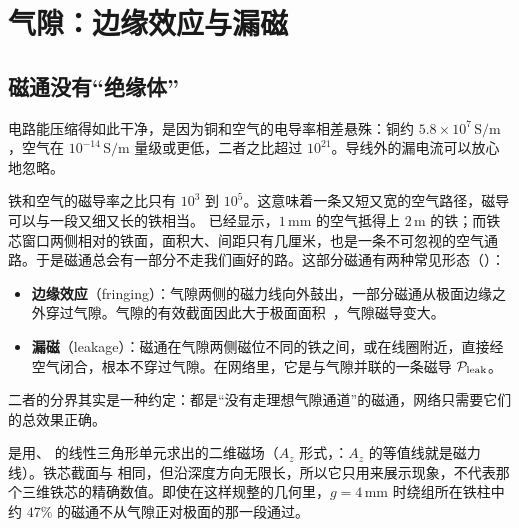 
\section{气隙：边缘效应与漏磁}\label{sec:lumped-fringing}

\subsection{磁通没有“绝缘体”}
电路能压缩得如此干净，是因为铜和空气的电导率相差悬殊：铜约 $5.8\times10^7\,\mathrm{S/m}$，空气在 $10^{-14}\,\mathrm{S/m}$ 量级或更低，二者之比超过 $10^{21}$。导线外的漏电流可以放心地忽略。

铁和空气的磁导率之比只有 $10^3$ 到 $10^5$。这意味着一条又短又宽的空气路径，磁导可以与一段又细又长的铁相当。 已经显示，$1\,\mathrm{mm}$ 的空气抵得上 $2\,\mathrm m$ 的铁；而铁芯窗口两侧相对的铁面，面积大、间距只有几厘米，也是一条不可忽视的空气通路。于是磁通总会有一部分不走我们画好的路。这部分磁通有两种常见形态（）：
\begin{itemize}
\item \textbf{边缘效应}（fringing）：气隙两侧的磁力线向外鼓出，一部分磁通从极面边缘之外穿过气隙。气隙的有效截面因此大于极面面积~\cite{fitzgerald}，气隙磁导变大。
\item \textbf{漏磁}（leakage）：磁通在气隙两侧磁位不同的铁之间，或在线圈附近，直接经空气闭合，根本不穿过气隙。在网络里，它是与气隙并联的一条磁导 $\mathcal P_{\rm leak}$。
\end{itemize}
二者的分界其实是一种约定：都是“没有走理想气隙通道”的磁通，网络只需要它们的总效果正确。


 是用、 的线性三角形单元求出的二维磁场（$A_z$ 形式，：$A_z$ 的等值线就是磁力线）。铁芯截面与 相同，但沿深度方向无限长，所以它只用来展示现象，不代表那个三维铁芯的精确数值。即使在这样规整的几何里，$g=4\,\mathrm{mm}$ 时绕组所在铁柱中约 $47\%$ 的磁通不从气隙正对极面的那一段通过。

